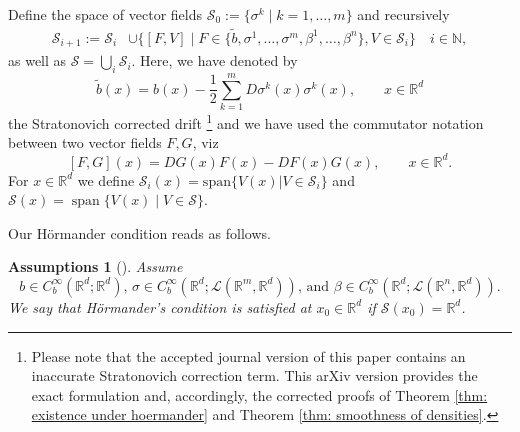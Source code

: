 \documentclass[11pt,a4paper]{article}
\newcommand{\R}{\mathbb{R}}
\theoremstyle{plain}
\newtheorem{assumptions}[defn]{Assumptions}
\begin{document}
Define the space of vector fields $\mathcal{S}_0 := \{\sigma^k \mid k=1,\dots,m\}$ and recursively 
\begin{equation}
\label{eq: def of S spaces}
\begin{aligned}
\mathcal{S}_{i+1} :=  \mathcal{S}_{i} &\cup
    \{
        [F,V] \mid F\in\{\tilde b , \sigma^1,\dots,\sigma^m,\beta^1,\dots,\beta^n\},
        V\in\mathcal{S}_{i}
    \} 
    \quad
    i\in \mathbb{N},
\end{aligned}  
\end{equation}
as well as $\mathcal{S} = \bigcup_{i} \mathcal{S}_{i}$. Here,
we have denoted by \begin{equation} \label{eq:Stratonovich corrected drift}
    \tilde b(x) = b(x) -\frac12 \sum_{k=1}^m D\sigma^k(x) \sigma^k(x), \qquad x \in \R^d
\end{equation} the Stratonovich corrected drift
\footnote{
Please note that the accepted journal version of this paper contains an inaccurate Stratonovich correction term. This arXiv version provides the exact formulation and, accordingly, the corrected proofs of Theorem \ref{thm: existence under hoermander} and Theorem \ref{thm: smoothness of densities}.
}
and we have used the commutator notation between two vector fields $F,G$, viz
\begin{equation*}
    \label{eq: lie brackets}
    [F,G](x) = DG(x)F(x)-DF(x)G(x), \qquad x\in \R^d.
\end{equation*}
For $x \in \R^d$ we define $\mathcal{S}_{i}(x) = \text{span}\{V(x) | V \in \mathcal{S}_{i} \}$ and $\mathcal{S}(x) = \operatorname{span}\{V(x) \mid V\in\mathcal{S}\}$. 

Our Hörmander condition reads as follows.
\begin{assumptions}[]
\label{def: heormander condition}
    Assume \begin{equation*}
        \text{$b \in {C}^{\infty}_b(\R^d;\R^d)$, $\sigma \in {C}^{\infty}_b(\R^d;\mathscr{L}(\R^m,\R^d))$, and
    $\beta \in {C}^{\infty}_b(\R^d;\mathscr{L}(\R^n,\R^d))$.}
    \end{equation*} 
We say that \textit{H\"ormander's condition} is satisfied {at $x_0 \in \R^d$} if $\mathcal{S}(x_0) = \R^d$.
\end{assumptions}
\end{document}
